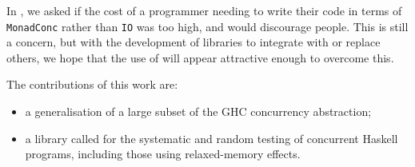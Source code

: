 In \cite{walker2015}, we asked if the cost of a programmer needing to
write their code in terms of \verb|MonadConc| rather than \verb|IO|
was too high, and would discourage people.  This is still a concern,
but with the development of libraries to integrate with or replace
others, we hope that the use of \dejafu{} will appear attractive
enough to overcome this.

The contributions of this work are:

\begin{itemize}
\item a generalisation of a large subset of the GHC concurrency
  abstraction;

\item a library called \dejafu{} for the systematic and random testing
  of concurrent Haskell programs, including those using relaxed-memory
  effects.
\end{itemize}

